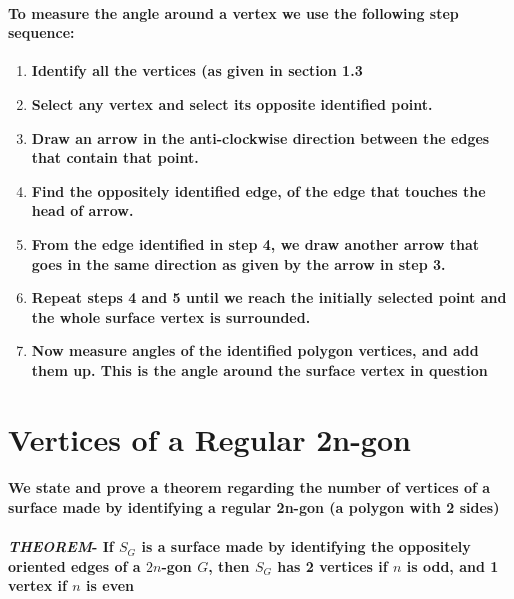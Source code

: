 \documentclass{report}
\begin{document}
\paragraph{To measure the angle around a vertex we use the following step sequence:}

\begin{enumerate}
\item \textbf{Identify all the vertices (as given in section 1.3}

\item \textbf{Select any vertex and select its opposite identified point.}

\item \textbf{Draw an arrow in the anti-clockwise direction between the edges that contain that point.}

\item \textbf{Find the oppositely identified edge, of the edge that touches the head of arrow.}

\item \textbf{From the edge identified in step 4, we draw another arrow that goes in the same direction as given by the arrow in step 3.}

\item \textbf{Repeat steps 4 and 5 until we reach the initially selected point and the whole surface vertex is surrounded.}

\item \textbf{Now measure angles of the identified polygon vertices, and add them up. This is the angle around the surface vertex in question}
\end{enumerate}


\section{Vertices of a Regular 2n-gon}

\paragraph{We state and prove a theorem regarding the number of vertices of a surface made by identifying a regular 2n-gon (a polygon with 2 sides)}

\paragraph{\textit{THEOREM}- If $S_G$ is a surface made by identifying the oppositely oriented edges of a $2n$-gon $G$, then 
$S_G$ has 2 vertices if $n$ is odd, and 1 vertex if $n$ is even}
\end{document}
